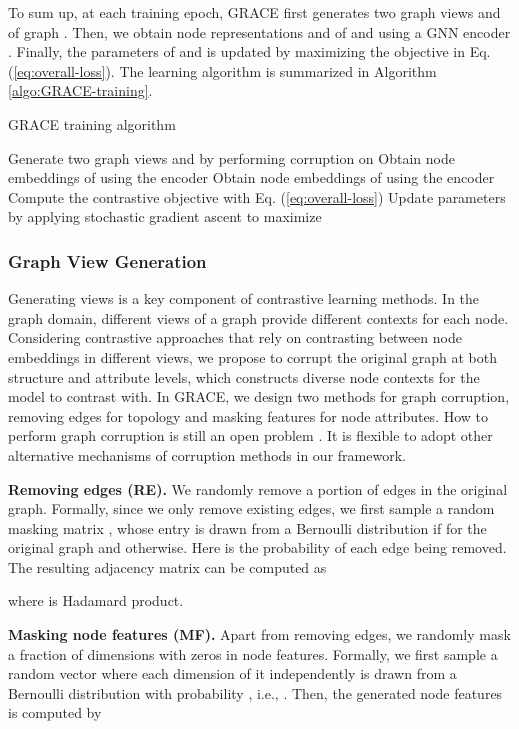 \documentclass{article}
\theoremstyle{remark}
\begin{document}
To sum up, at each training epoch, GRACE first generates two graph views  and  of graph . Then, we obtain node representations  and  of  and  using a GNN encoder . Finally, the parameters of  and  is updated by maximizing the objective in Eq. (\ref{eq:overall-loss}). The learning algorithm is summarized in Algorithm \ref{algo:GRACE-training}.

\begin{algorithm}[ht]
	\DontPrintSemicolon\SetNoFillComment
	\caption{GRACE training algorithm}
	\label{algo:GRACE-training}
	\For {} {
		Generate two graph views  and  by performing corruption on \;
		Obtain node embeddings  of  using the encoder \;
		Obtain node embeddings  of  using the encoder \;
		Compute the contrastive objective  with Eq. (\ref{eq:overall-loss})\;
		Update parameters by applying stochastic gradient ascent to maximize \;
	}
\end{algorithm}

\subsubsection{Graph View Generation}
\label{sec:generate-views}
Generating views is a key component of contrastive learning methods. In the graph domain, different views of a graph provide different contexts for each node. Considering contrastive approaches that rely on contrasting between node embeddings in different views, we propose to corrupt the original graph at both structure and attribute levels, which constructs diverse node contexts for the model to contrast with.
In GRACE, we design two methods for graph corruption, removing edges for topology and masking features for node attributes.
How to perform graph corruption is still an open problem \cite{Velickovic:2019tu}. It is flexible to adopt other alternative mechanisms of corruption methods in our framework.





\textbf{Removing edges (RE). \quad}
We randomly remove a portion of edges in the original graph. Formally, since we only remove existing edges, we first sample a random masking matrix , whose entry is drawn from a Bernoulli distribution  if  for the original graph and  otherwise. Here  is the probability of each edge being removed. The resulting adjacency matrix can be computed as

where  is Hadamard product.


\textbf{Masking node features (MF). \quad}
Apart from removing edges, we randomly mask a fraction of dimensions with zeros in node features. Formally, we first sample a random vector  where each dimension of it independently is drawn from a Bernoulli distribution with probability , i.e., . Then, the generated node features  is computed by
\end{document}
